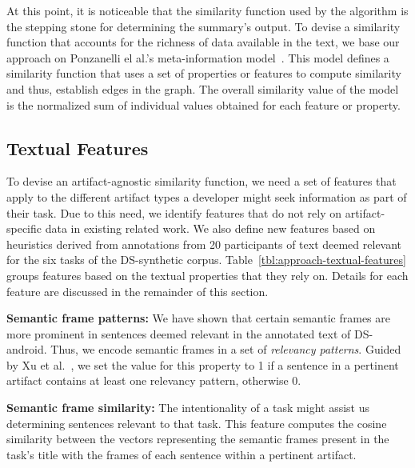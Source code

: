 At this point, it is noticeable that the similarity function used by the algorithm 
is the stepping stone for determining the summary's output.  
To devise a similarity function that accounts for the richness of data available in the 
text, we base our approach on Ponzanelli el al.'s meta-information model~\cite{Ponzanelli2015}.
This model defines a similarity function that uses a set of properties or features to compute similarity and thus, establish edges in the graph.
The overall similarity value of the model is the normalized sum of individual values obtained for each feature or property.



\subsection{Textual Features}



To devise an artifact-agnostic similarity function, we need a set of features that apply to the different artifact types a developer might seek information as part of their task.
Due to this need, we identify features that do not rely on artifact-specific data in existing related work. 
We also define new features based 
on heuristics derived from annotations from 20 participants of text deemed relevant
for the six tasks of the \acs{DS-synthetic} corpus.
Table~\ref{tbl:approach-textual-features} groups features based on the textual properties that they rely on. Details for each feature are discussed in the remainder of this section.




\vspace{3mm}
\begin{hangparas}{1em}{1}
    \textbf{Semantic frame patterns:} We have shown that certain semantic frames are more prominent in sentences deemed relevant in the annotated text of \acs{DS-android}.
    Thus, we encode semantic frames in a set of \textit{relevancy patterns}. 
    Guided by Xu et al.~\cite{Xu2017}, we set the value for this property to 1 if a sentence in a pertinent artifact contains at least one relevancy pattern, otherwise 0.
\end{hangparas}


\vspace{3mm}
\begin{hangparas}{1em}{1}
    \textbf{Semantic frame similarity:} The intentionality of a task might assist us determining sentences relevant to that task. 
    This feature computes the cosine similarity between the vectors representing the semantic frames present in the task's title with the frames of each sentence within a pertinent artifact. 
\end{hangparas}


